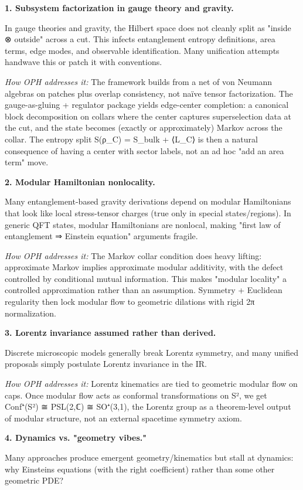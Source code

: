 \textbf{1. Subsystem factorization in gauge theory and gravity.}

In gauge theories and gravity, the Hilbert space does not cleanly split as "inside ⊗ outside" across a cut. This infects entanglement entropy definitions, area terms, edge modes, and observable identification. Many unification attempts handwave this or patch it with conventions.

\emph{How OPH addresses it:} The framework builds from a net of von Neumann algebras on patches plus overlap consistency, not na\"{i}ve tensor factorization. The gauge-as-gluing + regulator package yields edge-center completion: a canonical block decomposition on collars where the center captures superselection data at the cut, and the state becomes (exactly or approximately) Markov across the collar. The entropy split S(ρ\_C) = S\_bulk + ⟨L\_C⟩ is then a natural consequence of having a center with sector labels, not an ad hoc "add an area term" move.

\textbf{2. Modular Hamiltonian nonlocality.}

Many entanglement-based gravity derivations depend on modular Hamiltonians that look like local stress-tensor charges (true only in special states/regions). In generic QFT states, modular Hamiltonians are nonlocal, making "first law of entanglement ⇒ Einstein equation" arguments fragile.

\emph{How OPH addresses it:} The Markov collar condition does heavy lifting: approximate Markov implies approximate modular additivity, with the defect controlled by conditional mutual information. This makes "modular locality" a controlled approximation rather than an assumption. Symmetry + Euclidean regularity then lock modular flow to geometric dilations with rigid 2π normalization.

\textbf{3. Lorentz invariance assumed rather than derived.}

Discrete microscopic models generally break Lorentz symmetry, and many unified proposals simply postulate Lorentz invariance in the IR.

\emph{How OPH addresses it:} Lorentz kinematics are tied to geometric modular flow on caps. Once modular flow acts as conformal transformations on S², we get Conf⁺(S²) ≅ PSL(2,ℂ) ≅ SO⁺(3,1), the Lorentz group as a theorem-level output of modular structure, not an external spacetime symmetry axiom.

\textbf{4. Dynamics vs. "geometry vibes."}

Many approaches produce emergent geometry/kinematics but stall at dynamics: why Einstein\textquotesingle s equations (with the right coefficient) rather than some other geometric PDE?

